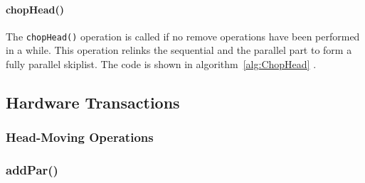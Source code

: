 \paragraph{chopHead()}

The \texttt{chopHead()} operation is called if no remove operations have been performed in a while. This operation relinks the sequential and the parallel part to form a fully parallel skiplist. The code is shown in algorithm~\ref{alg:ChopHead} \cite{calciu_adaptive_2014}.

\subsection{Hardware Transactions}

\subsubsection{Head-Moving Operations}

\subsubsection{addPar()}
